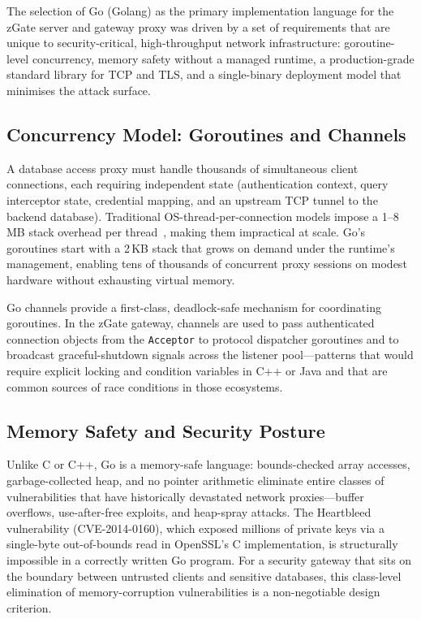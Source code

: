The selection of Go (Golang) as the primary implementation language for the zGate server and gateway proxy was driven by a set of requirements that are unique to security-critical, high-throughput network infrastructure: goroutine-level concurrency, memory safety without a managed runtime, a production-grade standard library for TCP and TLS, and a single-binary deployment model that minimises the attack surface.

\subsection{Concurrency Model: Goroutines and Channels}

A database access proxy must handle thousands of simultaneous client connections, each requiring independent state (authentication context, query interceptor state, credential mapping, and an upstream TCP tunnel to the backend database). Traditional OS-thread-per-connection models impose a 1--8\,MB stack overhead per thread~\cite{go-spec}, making them impractical at scale. Go's goroutines start with a 2\,KB stack that grows on demand under the runtime's management, enabling tens of thousands of concurrent proxy sessions on modest hardware without exhausting virtual memory.

Go channels provide a first-class, deadlock-safe mechanism for coordinating goroutines. In the zGate gateway, channels are used to pass authenticated connection objects from the \texttt{Acceptor} to protocol dispatcher goroutines and to broadcast graceful-shutdown signals across the listener pool---patterns that would require explicit locking and condition variables in C++ or Java and that are common sources of race conditions in those ecosystems.

\subsection{Memory Safety and Security Posture}

Unlike C or C++, Go is a memory-safe language: bounds-checked array accesses, garbage-collected heap, and no pointer arithmetic eliminate entire classes of vulnerabilities that have historically devastated network proxies---buffer overflows, use-after-free exploits, and heap-spray attacks. The Heartbleed vulnerability (CVE-2014-0160), which exposed millions of private keys via a single-byte out-of-bounds read in OpenSSL's C implementation, is structurally impossible in a correctly written Go program. For a security gateway that sits on the boundary between untrusted clients and sensitive databases, this class-level elimination of memory-corruption vulnerabilities is a non-negotiable design criterion.

